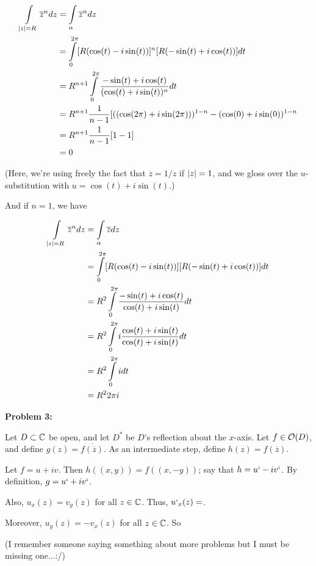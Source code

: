 \documentclass[a4paper,12pt]{article}
\begin{document}
\begin{align*}
\int\limits_{\left\lvert z \right\rvert = R} \overline{z}^n dz &= \int\limits_\alpha \overline{z}^n dz\\
&= \int\limits_0^{2\pi} [R(\cos(t) - i \sin(t))]^n [R(-\sin(t)+i\cos(t))] dt \\
&=R^{n+1}\int\limits_0^{2\pi} \frac{-\sin(t)+i\cos(t)}{(\cos(t)+i\sin(t))^n}dt\\
&= R^{n+1} \frac{1}{n-1} [((\cos(2\pi)+i\sin(2\pi)))^{1-n} - (\cos(0)+i\sin(0))^{1-n}\\
&= R^{n+1} \frac{1}{n-1} [1-1]\\
&= 0
\end{align*}

(Here, we're using freely the fact that $\overline{z} = 1/z$ if $\left\lvert z \right\rvert=1$, and we gloss over the $u$-substitution with $u = \cos(t)+i\sin(t)$.)

And if $n=1$, we have

\begin{align*}
\int\limits_{\left\lvert z \right\rvert = R} \overline{z}^n dz &= \int\limits_\alpha \overline{z} dz\\
&= \int\limits_0^{2\pi} [R(\cos(t) - i \sin(t))] [R(-\sin(t)+i\cos(t))] dt \\
&=R^{2}\int\limits_0^{2\pi} \frac{-\sin(t)+i\cos(t)}{\cos(t)+i\sin(t)}dt\\
&= R^2\int\limits_0^{2\pi} i\frac{\cos(t)+i\sin(t)}{\cos(t)+i\sin(t)}dt\\
&= R^2\int\limits_0^{2\pi} idt\\
&= R^22\pi i 
\end{align*}

\shunt

{\bf Problem 3:}

Let $D \subset \mathbb{C}$ be open, and let $D^*$ be $D$'s reflection about the $x$-axis. Let $f \in \mathcal{O} (D)$, and define $g(z) = \overline{f(\overline{z})}$. As an intermediate step, define $h(z) = f(\overline{z})$.

Let $f=u+iv$. Then $h((x,y))=f((x,-y))$; say that $h=u`-iv`$. By definition, $g=u`+iv`$. %

Also, $u_x(z)=v_y(z)$ for all $z \in \mathbb{C}$. Thus, $u`_x(z) = $.%

Moreover, $u_y(z)=-v_x(z)$ for all $z \in \mathbb{C}$. So %

\shunt

(I remember someone saying something about more problems but I must be missing one...:/)
\end{document}
